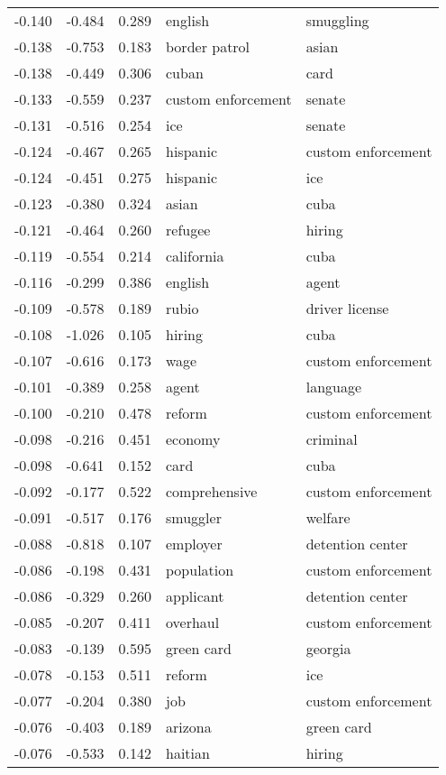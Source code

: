 \begin{tabular}{cccp{5cm}p{5cm}}
-0.140 & -0.484 & 0.289 & english & smuggling \\
-0.138 & -0.753 & 0.183 & border patrol & asian \\
-0.138 & -0.449 & 0.306 & cuban & card \\
-0.133 & -0.559 & 0.237 & custom enforcement & senate \\
-0.131 & -0.516 & 0.254 & ice & senate \\
-0.124 & -0.467 & 0.265 & hispanic & custom enforcement \\
-0.124 & -0.451 & 0.275 & hispanic & ice \\
-0.123 & -0.380 & 0.324 & asian & cuba \\
-0.121 & -0.464 & 0.260 & refugee & hiring \\
-0.119 & -0.554 & 0.214 & california & cuba \\
-0.116 & -0.299 & 0.386 & english & agent \\
-0.109 & -0.578 & 0.189 & rubio & driver license \\
-0.108 & -1.026 & 0.105 & hiring & cuba \\
-0.107 & -0.616 & 0.173 & wage & custom enforcement \\
-0.101 & -0.389 & 0.258 & agent & language \\
-0.100 & -0.210 & 0.478 & reform & custom enforcement \\
-0.098 & -0.216 & 0.451 & economy & criminal \\
-0.098 & -0.641 & 0.152 & card & cuba \\
-0.092 & -0.177 & 0.522 & comprehensive & custom enforcement \\
-0.091 & -0.517 & 0.176 & smuggler & welfare \\
-0.088 & -0.818 & 0.107 & employer & detention center \\
-0.086 & -0.198 & 0.431 & population & custom enforcement \\
-0.086 & -0.329 & 0.260 & applicant & detention center \\
-0.085 & -0.207 & 0.411 & overhaul & custom enforcement \\
-0.083 & -0.139 & 0.595 & green card & georgia \\
-0.078 & -0.153 & 0.511 & reform & ice \\
-0.077 & -0.204 & 0.380 & job & custom enforcement \\
-0.076 & -0.403 & 0.189 & arizona & green card \\
-0.076 & -0.533 & 0.142 & haitian & hiring \\

\end{tabular}
